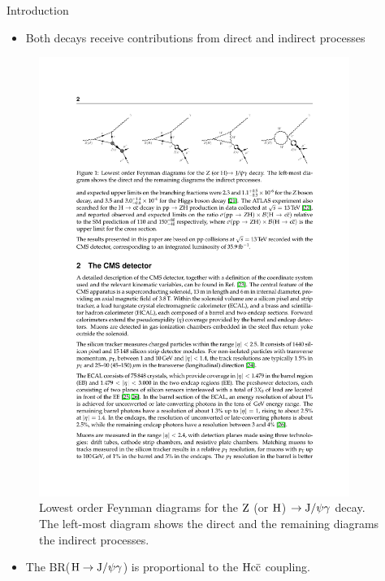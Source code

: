\documentclass[aspectratio = 1610, xcolor = dvipsnames]{beamer}
\renewcommand{\H}{{\rm H}}
\newcommand{\Z}{{\rm Z}}
\newcommand{\JPsi}{{\rm J}/\psi}
\begin{document}
	
	\begin{frame}[t]{Introduction}
        
        \begin{itemize}
			\item Both decays receive contributions from \textcolor{unipd}{direct} and \textcolor{unipd}{indirect} processes
		\end{itemize}

		\begin{figure}[c]
			\centering
			\includegraphics[width=0.9\textwidth]{images/direct_and_indirect_processes.pdf}
			\caption{Lowest order Feynman diagrams for the $\Z$ (or $\H$) $\rightarrow \JPsi\gamma$ decay. The left-most diagram shows the direct and the remaining diagrams the indirect processes\footnotemark.
			\label{im:direct_and_indirect_processes}}
	    \end{figure}

	    
	    \begin{itemize}
			\item The BR($\H\rightarrow\JPsi\gamma$) is \textcolor{unipd}{proportional to the ${\rm H}{\rm c}{\rm \bar{c}}$ coupling}.
		\end{itemize}

	\end{frame}
	
\end{document}
